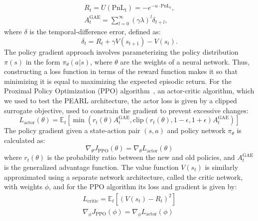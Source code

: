\documentclass[11pt]{article}
\begin{document}
    \begin{align}
        R_t = U(\text{PnL}_t) = -e^{-u \cdot \text{PnL}_t},\\
        A^{\text{GAE}}_t = \sum_{l=0}^{\infty} (\gamma \lambda)^l \delta_{t+l},
        \label{eq:reward}
    \end{align}
    where $\delta$ is the temporal-difference error, defined as:
    \begin{equation}
        \delta_t = R_t + \gamma V(s_{t+1}) - V(s_t).
        \label{eq:td}
    \end{equation}
    The policy gradient approach involves parameterizing the policy distribution 
    $\pi(s)$ in the form $\pi_\theta(a|s)$, where $\theta$ are the weights of a neural network.
    Thus, constructing a loss function in terms of the reward function makes it so that minimizing 
    it is equal to maximizing the expected episodic return.
    For the Proximal Policy Optimization (PPO) algorithm~\citep{Schulman2017}, 
    an actor-critic algorithm, which we used to test the PEARL architecture,
    the actor loss is given by a clipped surrogate objective, used to constrain the gradient to prevent excessive changes:
    \begin{equation}
        L_{\text{actor}}(\theta) = \mathbb{E}_t \left[ 
            \min \left( r_t(\theta) A^{\text{GAE}}_t, \text{clip}(r_t(\theta), 1-\epsilon, 1+\epsilon) A^{\text{GAE}}_t \right) 
        \right]
        \label{eq:actor_loss}
    \end{equation}
    The policy gradient given a state-action pair \( (s, a) \) and policy network \( \pi_\theta \) is calculated as:
    \begin{equation}
        \nabla_\theta J_\text{PPO}(\theta) = \nabla_\theta L_{\text{actor}}(\theta)
        \label{eq:actor_gradient}
    \end{equation}
    where \( r_t(\theta) \) is the probability ratio between the new and old policies, 
    and \( A^{\text{GAE}}_t \) is the generalized advantage function.
    The value function $V(s_t)$ is similarly approximated using a separate network architecture, 
    called the critic network, with weights $\phi$, 
    and for the PPO algorithm its loss and gradient is given by:
    \begin{equation}        
        \begin{aligned}
            L_{\text{critic}} = \mathbb{E}_t \left[ (V(s_t) - R_t)^2 \right]\\ 
            \nabla_\phi J_\text{PPO}(\phi) = \nabla_\phi L_{\text{actor}}(\phi)
        \end{aligned}
        \label{eq:critic_loss}
    \end{equation}
\end{document}
